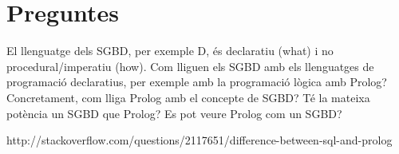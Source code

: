 \section{Preguntes}

El llenguatge dels SGBD, per exemple D, és declaratiu (what) i no procedural/imperatiu (how). Com lliguen els SGBD amb els llenguatges de programació declaratius, per exemple amb la programació lògica amb Prolog? Concretament, com lliga Prolog amb el concepte de SGBD? Té la mateixa potència un SGBD que Prolog?
 Es pot veure Prolog com un SGBD?

http://stackoverflow.com/questions/2117651/difference-between-sql-and-prolog






